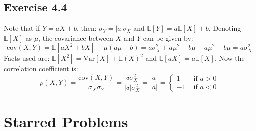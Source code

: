 \documentclass{article}
\begin{document}
\subsection*{Exercise 4.4}
\begin{flushleft}
Note that if \(Y = aX + b\), then: \(\sigma_{Y} = |a|\sigma_{X}\) and \(\mathbb{E}[Y] = a\mathbb{E}[X] + b\). Denoting \(\mathbb{E}[X]\) as \(\mu\), the covariance between \(X\) and \(Y\) can be given by:
\begin{equation}
\mathrm{cov}(X, Y) = \mathbb{E}[aX^2 + bX] - \mu(a\mu + b) = a\sigma_{X}^{2} + a\mu^{2} + b\mu - a\mu^{2} - b\mu = a\sigma_{X}^{2}
\end{equation}
Facts used are: \(\mathbb{E}[X^2] = \mathrm{Var}[X] + \mathbb{E}(X)^2\) and \(\mathbb{E}[aX] = a\mathbb{E}[X]\). Now the correlation coefficient is:
\begin{equation}
\rho(X, Y) = \frac{\mathrm{cov}(X, Y)}{\sigma_{X}\sigma_{Y}} = \frac{a\sigma_{X}^{2}}{|a|\sigma_{X}^{2}} = \frac{a}{|a|} =
\begin{cases}
1 & \text{ if } a > 0 \\
-1 & \text{ if } a < 0
\end{cases}
\end{equation}
\end{flushleft}

\section*{Starred Problems}
\end{document}
